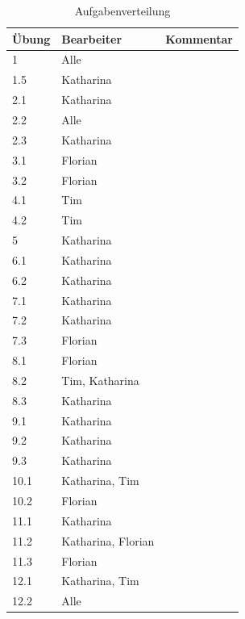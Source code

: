 \documentclass[12pt,a4paper,bibliography=totocnumbered,listof=totocnumbered]{scrartcl}
\begin{document}
    \begin{table}[]
        \centering
        \caption{Aufgabenverteilung}
        \label{tab:Aufgabenverteilung}
        \begin{tabular}{|l|l|l|}
            \hline
            \textbf{Übung} & \textbf{Bearbeiter} & \textbf{Kommentar} \\ \hline
            1 & Alle   &       \\ \hline
            1.5 & Katharina   &           \\ \hline
            2.1 &  Katharina     &           \\ \hline
            2.2 &  Alle     &           \\ \hline
            2.3 &  Katharina     &           \\ \hline
            3.1 &    Florian   &           \\ \hline
            3.2 &    Florian   &           \\ \hline
            4.1 &      Tim &           \\ \hline
            4.2 &      Tim &           \\ \hline
            5 &      Katharina &           \\ \hline
            6.1 &    Katharina   &           \\ \hline
            6.2 &     Katharina  &           \\ \hline
            7.1 &     Katharina  &           \\ \hline
            7.2 &    Katharina   &           \\ \hline
            7.3 &    Florian   &           \\ \hline
            8.1 &    Florian   &           \\ \hline
            8.2 &    Tim, Katharina   &           \\ \hline
            8.3 &    Katharina   &           \\ \hline
            9.1 &     Katharina  &           \\ \hline
            9.2 &     Katharina  &           \\ \hline
            9.3 &      Katharina &           \\ \hline
            10.1 &    Katharina, Tim   &           \\ \hline
            10.2 &     Florian  &           \\ \hline
            11.1 &   Katharina    &           \\ \hline
            11.2 &   Katharina, Florian    &           \\ \hline
            11.3 &   Florian   &           \\ \hline
            12.1 &     Katharina, Tim  &           \\ \hline
            12.2 &    Alle   &           \\ \hline
        \end{tabular}
    \end{table}
\end{document}
